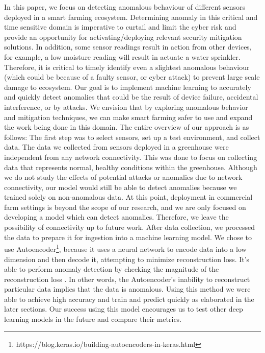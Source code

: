 In this paper, we focus on detecting anomalous behaviour of different sensors deployed in a smart farming ecosystem. Determining anomaly in this critical and time sensitive domain is imperative to curtail and limit the cyber risk and provide an opportunity for activating/deploying relevant security mitigation solutions. In addition, some sensor readings result in action from other devices, for example, a low moisture reading will result in actuate a water sprinkler. Therefore, it is critical to timely identify even a slightest anomalous behaviour (which could be because of a faulty sensor, or cyber attack) to prevent large scale damage to ecosystem. Our goal is to implement machine learning to accurately and quickly detect anomalies that could be the result of device failure, accidental interference, or by attacks. We envision that by exploring anomalous behavior and mitigation techniques, we can make smart farming safer to use and expand the work being done in this domain. The entire overview of our approach is as follows:
The first step was to select sensors, set up a test environment, and collect data. The data we collected from sensors deployed in a greenhouse were independent from any network connectivity. This was done to focus on collecting data that represents normal, healthy conditions within the greenhouse. Although we do not study the effects of potential attacks or anomalies due to network connectivity, our model would still be able to detect anomalies because we trained solely on non-anomalous data. At this point, deployment in commercial farm settings is beyond the scope of our research, and we are only focused on developing a model which can detect anomalies. Therefore, we leave the possibility of connectivity up to future work. After data collection, we processed the data to prepare it for ingestion into a machine learning model. We chose to use Autoencoder\footnote{https://blog.keras.io/building-autoencoders-in-keras.html}, because it uses a neural network to encode data into a low dimension and then decode it, attempting to minimize reconstruction loss. It's able to perform anomaly detection by checking the magnitude of the reconstruction loss \cite{adwithauto}. In other words, the Autoencoder's inability to reconstruct particular data implies that the data is anomalous. Using this method we were able to achieve high accuracy and train and predict quickly as elaborated in the later sections. Our success using this model encourages us to test other deep learning models in the future and compare their metrics.

